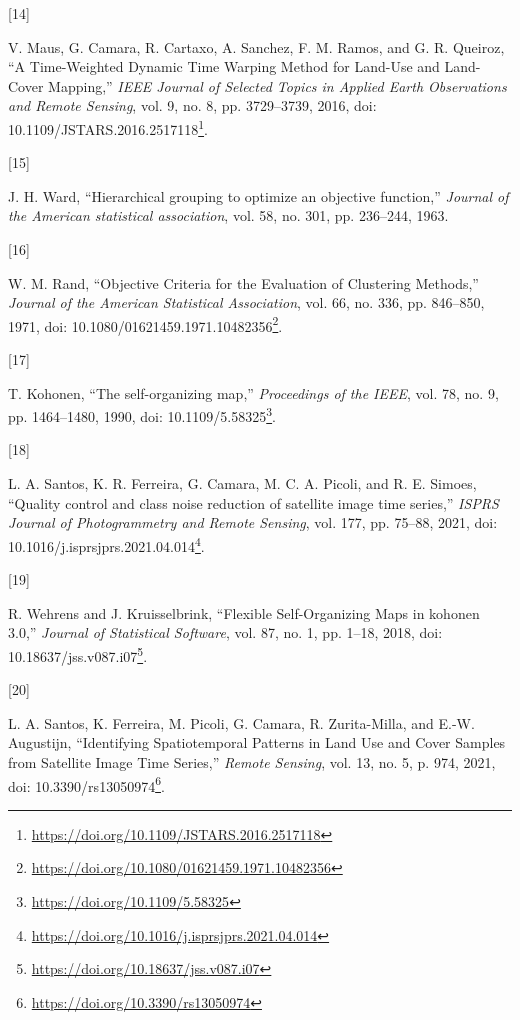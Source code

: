 \documentclass[
  11pt,
]{report}
\newlength{\cslhangindent}
\newlength{\csllabelwidth}
\newlength{\cslentryspacingunit} %
\newenvironment{CSLReferences}[2] %
 {%
  \setlength{\parindent}{0pt}
  \ifodd #1
  \let\oldpar\par
  \def\par{\hangindent=\cslhangindent\oldpar}
  \fi
  \setlength{\parskip}{#2\cslentryspacingunit}
 }%
 {}
\newcommand{\CSLLeftMargin}[1]{\parbox[t]{\csllabelwidth}{#1}}
\newcommand{\CSLRightInline}[1]{\parbox[t]{\linewidth - \csllabelwidth}{#1}\break}
\renewcommand{\href}[2]{#2\footnote{\url{#1}}}
\begin{document}
\begin{CSLReferences}{0}{0}
\leavevmode{}%
\CSLLeftMargin{{[}14{]} }%
\CSLRightInline{V. Maus, G. Camara, R. Cartaxo, A. Sanchez, F. M. Ramos,
and G. R. Queiroz, {``A {Time-Weighted Dynamic Time Warping Method} for
{Land-Use} and {Land-Cover Mapping},''} \emph{IEEE Journal of Selected
Topics in Applied Earth Observations and Remote Sensing}, vol. 9, no. 8,
pp. 3729--3739, 2016, doi:
\href{https://doi.org/10.1109/JSTARS.2016.2517118}{10.1109/JSTARS.2016.2517118}.}

\leavevmode{}%
\CSLLeftMargin{{[}15{]} }%
\CSLRightInline{J. H. Ward, {``Hierarchical grouping to optimize an
objective function,''} \emph{Journal of the American statistical
association}, vol. 58, no. 301, pp. 236--244, 1963.}

\leavevmode{}%
\CSLLeftMargin{{[}16{]} }%
\CSLRightInline{W. M. Rand, {``Objective {Criteria} for the {Evaluation}
of {Clustering Methods},''} \emph{Journal of the American Statistical
Association}, vol. 66, no. 336, pp. 846--850, 1971, doi:
\href{https://doi.org/10.1080/01621459.1971.10482356}{10.1080/01621459.1971.10482356}.}

\leavevmode{}%
\CSLLeftMargin{{[}17{]} }%
\CSLRightInline{T. Kohonen, {``The self-organizing map,''}
\emph{Proceedings of the IEEE}, vol. 78, no. 9, pp. 1464--1480, 1990,
doi: \href{https://doi.org/10.1109/5.58325}{10.1109/5.58325}.}

\leavevmode{}%
\CSLLeftMargin{{[}18{]} }%
\CSLRightInline{L. A. Santos, K. R. Ferreira, G. Camara, M. C. A.
Picoli, and R. E. Simoes, {``Quality control and class noise reduction
of satellite image time series,''} \emph{ISPRS Journal of Photogrammetry
and Remote Sensing}, vol. 177, pp. 75--88, 2021, doi:
\href{https://doi.org/10.1016/j.isprsjprs.2021.04.014}{10.1016/j.isprsjprs.2021.04.014}.}

\leavevmode{}%
\CSLLeftMargin{{[}19{]} }%
\CSLRightInline{R. Wehrens and J. Kruisselbrink, {``Flexible
{Self-Organizing Maps} in kohonen 3.0,''} \emph{Journal of Statistical
Software}, vol. 87, no. 1, pp. 1--18, 2018, doi:
\href{https://doi.org/10.18637/jss.v087.i07}{10.18637/jss.v087.i07}.}

\leavevmode{}%
\CSLLeftMargin{{[}20{]} }%
\CSLRightInline{L. A. Santos, K. Ferreira, M. Picoli, G. Camara, R.
Zurita-Milla, and E.-W. Augustijn, {``Identifying {Spatiotemporal
Patterns} in {Land Use} and {Cover Samples} from {Satellite Image Time
Series},''} \emph{Remote Sensing}, vol. 13, no. 5, p. 974, 2021, doi:
\href{https://doi.org/10.3390/rs13050974}{10.3390/rs13050974}.}


\end{CSLReferences}
\end{document}
